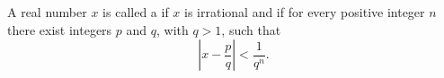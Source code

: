 A real number $x$ is called a  if $x$ is irrational and if for every positive integer $n$ there exist integers $p$ and $q$, with $q > 1$, such that
$$\left| x - \frac{p}{q} \right| < \frac{1}{q^n}.$$
